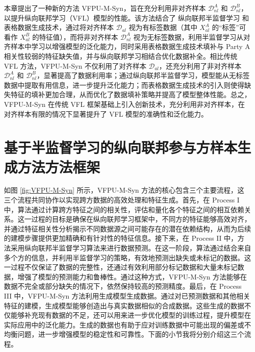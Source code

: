 本章提出了一种新的方法 VFPU-M-Syn，旨在充分利用非对齐样本 $\mathcal{D}^A_{nl}$ 和 $\mathcal{D}^B_{nl}$，以提升纵向联邦学习（VFL）模型的性能。该方法结合了 纵向联邦半监督学习 和 表格数据生成技术，通过将对齐样本 $\mathcal{D}_{al}$ 视为有标签数据（其中 $X^A_{al}$ 的“标签”可看作 $X^B_{al}$ 的特征值），而将非对齐样本 $\mathcal{D}^A_{nl}$ 视为无标签数据，利用半监督学习从对齐样本中学习以增强模型的泛化能力，同时采用表格数据生成技术填补与 Party A 相关性较弱的特征缺失值，并与纵向联邦学习相结合优化数据补全。相比传统 VFL 方法，VFPU-M-Syn 不仅利用了对齐样本 $\mathcal{D}_{al}$，还充分利用了非对齐样本 $\mathcal{D}^A_{nl}$ 和 $\mathcal{D}^B_{nl}$，显著提高了数据利用率；通过纵向联邦半监督学习，模型能从无标签数据中提取有用信息，进一步提升泛化能力；而表格数据生成技术的引入则使得缺失特征的填补更加合理，从而优化了数据填补策略并提高了模型整体性能。总之，VFPU-M-Syn 在传统 VFL 框架基础上引入创新技术，充分利用非对齐样本，在对齐样本有限的情况下显著提升了 VFL 模型的准确性和泛化能力。
\section{基于半监督学习的纵向联邦参与方样本生成方法方法框架}
如图 \ref{fig:VFPU-M-Syn} 所示，VFPU-M-Syn 方法的核心包含三个主要流程，这三个流程共同协作以实现跨方数据的高效处理和特征生成。首先，在 Process I 中，算法通过计算跨方特征之间的相关性，评估和量化各个特征之间的相互依赖关系。这一过程的目标是确保在纵向联邦学习框架中，不同方的特征能够高效对齐，并通过特征相关性分析揭示不同数据源之间可能存在的潜在依赖结构，从而为后续的建模步骤提供更加精确和有针对性的特征信息。接下来，在 Process II 中，方法采用纵向联邦半监督学习算法来进行数据预测。在这一阶段，算法通过结合来自多个方的信息，并利用半监督学习的策略，有效地预测出缺失或未标记的数据。这一过程不仅保证了数据的完整性，还通过有效利用部分标记数据和大量未标记数据，增强了模型的预测能力和鲁棒性。通过这种方式，VFPU-M-Syn 方法能够在数据不完全或部分缺失的情况下，依然保持较高的预测精度。最后，在 Process III 中，VFPU-M-Syn 方法利用生成模型生成数据。通过对已预测数据和其他相关特征的建模，生成模型能够创造出与真实数据相似的合成数据。这些生成的数据不仅能够补充现有数据的不足，还可以用来进一步优化模型的训练过程，提升模型在实际应用中的泛化能力。生成的数据也有助于应对训练数据中可能出现的偏差或不均衡问题，进一步增强模型的稳定性和可靠性。下面的小节我将分别介绍这三个流程。

